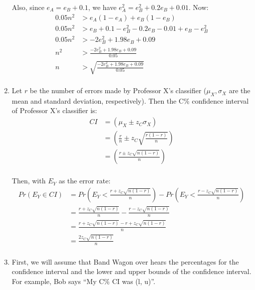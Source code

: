 \documentclass[12pt]{article}
\begin{document}
\begin{enumerate}
    Also, since $e_A=e_B+0.1$, we have $e_A^2=e_B^2+0.2e_B+0.01$. Now:
    \begin{equation}
      \begin{split}
        0.05n^2&>e_A\left(1-e_A\right)+e_B\left(1-e_B\right)\\
        0.05n^2&>e_B+0.1-e_B^2-0.2e_B-0.01+e_B-e_B^2\\
        0.05n^2&>-2e_B^2+1.98e_B+0.09\\
        n^2&>\frac{-2e_B^2+1.98e_B+0.09}{0.05}\\
        n&>\sqrt{\frac{-2e_B^2+1.98e_B+0.09}{0.05}}\\
      \end{split}
    \end{equation}
  \item
    Let $r$ be the number of errors made by Professor X's classifier
    ($\mu_X, \sigma_X$ are the mean and standard deviation, respectively). Then
    the C\% confidence interval of Professor X's classifier is:
    \begin{equation}
      \begin{split}
        CI&=\left(\mu_X\pm z_C\sigma_X\right)\\
        &=\left(\frac{r}{n}\pm z_C\sqrt{\frac{r\left(1-r\right)}{n}}\right)\\
        &=\left(\frac{r\pm z_C\sqrt{n\left(1-r\right)}}{n}\right)\\
      \end{split}
    \end{equation}

    Then, with $E_Y$ as the error rate:
    \begin{equation}
      \begin{split}
        Pr\left(E_Y\in CI\right)&
          =Pr\left(E_Y<\frac{r+z_C\sqrt{n\left(1-r\right)}}{n}\right)-
          Pr\left(E_Y<\frac{r-z_C\sqrt{n\left(1-r\right)}}{n}\right)\\
        &=\frac{r+z_C\sqrt{n\left(1-r\right)}}{n}-\frac{r-z_C\sqrt{n\left(1-r\right)}}{n}\\
        &=\frac{r+z_C\sqrt{n\left(1-r\right)}-r+z_C\sqrt{n\left(1-r\right)}}{n}\\
        &=\frac{2z_C\sqrt{n\left(1-r\right)}}{n}\\
      \end{split}
    \end{equation}
  \item
    First, we will assume that Band Wagon over hears the percentages for the
    confidence interval and the lower and upper bounds of the confidence
    interval. For example, Bob says ``My C\% CI was (l, u)''.


\end{enumerate}
\end{document}
